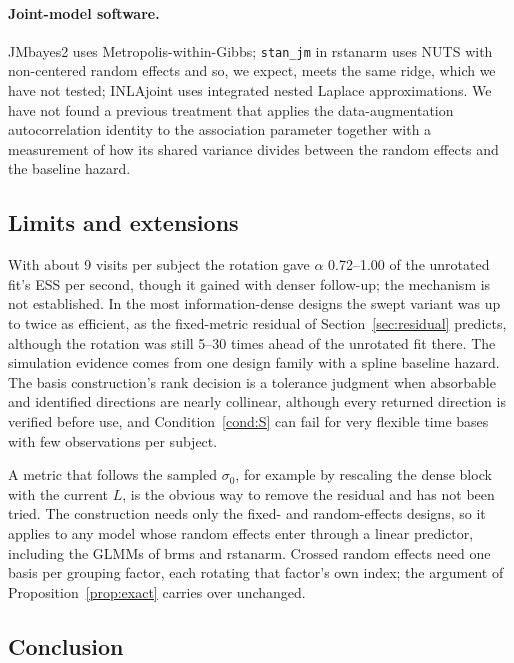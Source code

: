 \paragraph{Joint-model software.} JMbayes2 \citep{jmbayes2} uses
Metropolis-within-Gibbs; \texttt{stan\_jm} in rstanarm
\citep{brilleman2018} uses NUTS with non-centered random effects and so,
we expect, meets the same ridge, which we have not tested; INLAjoint
\citep{rustand2024} uses integrated nested Laplace approximations. We have
not found a previous treatment that applies the data-augmentation
autocorrelation identity \citep{liu1994} to the association parameter
together with a measurement of how its shared variance divides between the
random effects and the baseline hazard.

\subsection{Limits and extensions}

With about 9 visits per subject the rotation gave $\alpha$ 0.72--1.00 of
the unrotated fit's ESS per second, though it gained with denser follow-up;
the mechanism is not established. In the most information-dense designs
the swept variant was up to twice as efficient, as the fixed-metric
residual of Section~\ref{sec:residual} predicts, although the rotation was
still 5--30 times ahead of the unrotated fit there. The simulation
evidence comes from one design family with a spline baseline hazard. The
basis construction's rank decision is a tolerance judgment when
absorbable and identified directions are nearly collinear, although every
returned direction is verified before use, and Condition~\ref{cond:S} can
fail for very flexible time bases with few observations per subject.

A metric that follows the sampled $\sigma_0$, for example by rescaling the
dense block with the current $L$, is the obvious way to remove the
residual and has not been tried. The construction needs only the fixed-
and random-effects designs, so it applies to any model whose random
effects enter through a linear predictor, including the GLMMs of brms and
rstanarm. Crossed random effects need one basis per grouping factor, each
rotating that factor's own index; the argument of
Proposition~\ref{prop:exact} carries over unchanged.

\subsection{Conclusion}

